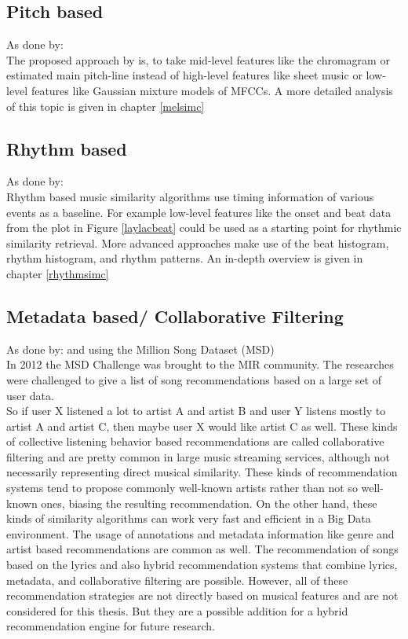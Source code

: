 \subsection{Pitch based}

As done by: \cite{pitch1}\\
The proposed approach by \cite{pitch1} is, to take mid-level features like the chromagram or estimated main pitch-line instead of high-level features like sheet music or low-level features like Gaussian mixture models of MFCCs. 
A more detailed analysis of this topic is given in chapter \ref{melsimc}

\subsection{Rhythm based}

As done by: \cite{rhythm1}\\
Rhythm based music similarity algorithms use timing information of various events as a baseline. 
For example low-level features like the onset and beat data from the plot in Figure \ref{laylacbeat} could be used as a starting point for rhythmic similarity retrieval. More advanced approaches make use of the beat histogram, rhythm histogram, and rhythm patterns. 
An in-depth overview is given in chapter \ref{rhythmsimc}

\subsection{Metadata based/ Collaborative Filtering}\label{collaborative}

As done by: \cite{metadat1} and \cite{msd4} using the Million Song Dataset (MSD) \cite{msd1}\\
In 2012 the MSD Challenge was brought to the MIR community. The researches were challenged to give a list of song recommendations based on a large set of user data.\\ 
So if user X listened a lot to artist A and artist B and user Y listens mostly to artist A and artist C, then maybe user X would like artist C as well. 
These kinds of collective listening behavior based recommendations are called collaborative filtering \cite[p. 192f.]{knees1} and are pretty common in large music streaming services, although not necessarily representing direct musical similarity.
These kinds of recommendation systems tend to propose commonly well-known artists rather than not so well-known ones, biasing the resulting recommendation. On the other hand, these kinds of similarity algorithms can work very fast and efficient in a Big Data environment.
The usage of annotations and metadata information like genre and artist based recommendations are common as well. The recommendation of songs based on the lyrics and also hybrid recommendation systems that combine lyrics, metadata, and collaborative filtering are possible. 
However, all of these recommendation strategies are not directly based on musical features and are not considered for this thesis. But they are a possible addition for a hybrid recommendation engine for future research. 

